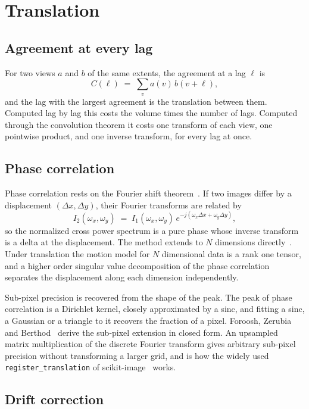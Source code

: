 \chapter{Translation}

\section{Agreement at every lag}

For two views \(a\) and \(b\) of the same extents, the agreement at a lag \(\ell\) is
\[
C(\ell) \;=\; \sum_{v} a(v)\, b(v + \ell),
\]
and the lag with the largest agreement is the translation between them. Computed lag by lag this
costs the volume times the number of lags. Computed through the convolution theorem it costs one
transform of each view, one pointwise product, and one inverse transform, for every lag at once.

\section{Phase correlation}

Phase correlation rests on the Fourier shift theorem~\cite{src:Wikipedia-Phase-correlation}. If two images differ by a displacement
\((\Delta x, \Delta y)\), their Fourier transforms are related by
\[
I_2(\omega_x, \omega_y) \;=\; I_1(\omega_x, \omega_y)\, e^{-j(\omega_x \Delta x + \omega_y \Delta y)},
\]
so the normalized cross power spectrum is a pure phase whose inverse transform is a delta at the
displacement. The method extends to \(N\) dimensions directly~\cite{src:doi-10-1109-tip-2005-849327}. Under translation the motion model
for \(N\) dimensional data is a rank one tensor, and a higher order singular value decomposition of
the phase correlation separates the displacement along each dimension independently.

Sub-pixel precision is recovered from the shape of the peak. The peak of phase correlation is a
Dirichlet kernel, closely approximated by a sinc, and fitting a sinc, a Gaussian or a triangle to it
recovers the fraction of a pixel. Foroosh, Zerubia and Berthod~\cite{src:Foroosh-Zerubia-and-Berthod} derive the sub-pixel extension in
closed form. An upsampled matrix multiplication of the discrete Fourier transform gives arbitrary
sub-pixel precision without transforming a larger grid, and is how the widely used
\texttt{register\_translation} of scikit-image~\cite{src:scikit-image} works.

\section{Drift correction}

